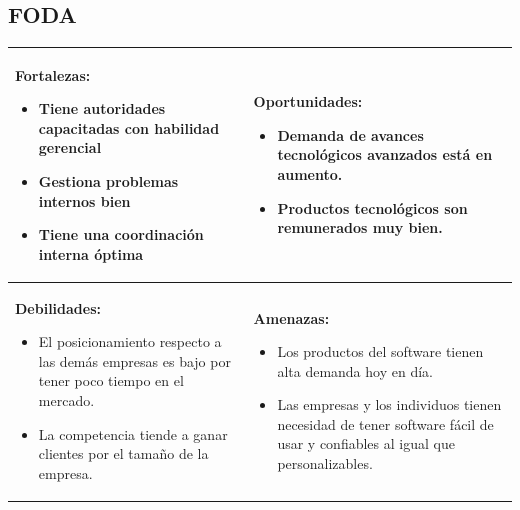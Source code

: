 \documentclass{article}
\begin{document}
\subsection{FODA}
\begin{center}
    \begin{tabular}{ | p{8.25cm} | p{8.25cm} | }
         \hline
             \textbf{Fortalezas: } 
             \begin{itemize}
                 \item Tiene autoridades capacitadas con habilidad gerencial 
                 \item Gestiona problemas internos bien 
                 \item Tiene una coordinación interna óptima
             \end{itemize}
             &
             \textbf{Oportunidades: } 
             \begin{itemize}
                 \item Demanda de avances tecnológicos avanzados está en aumento.
                 \item Productos tecnológicos son remunerados muy bien.
             \end{itemize}
             \\ 
         \hline
             \textbf{Debilidades: } 
             \begin{itemize}
                 \item El posicionamiento respecto a las demás empresas es bajo por tener poco tiempo en el mercado.
                 \item La competencia tiende a ganar clientes por el tamaño de la empresa.
             \end{itemize}
             &
             \textbf{Amenazas: } 
             \begin{itemize}
                 \item Los productos del software tienen alta demanda hoy en día.
                 \item Las empresas y los individuos tienen necesidad de tener software fácil de usar y confiables al igual que personalizables.
             \end{itemize}
             \\ 
         \hline
    \end{tabular}
 \end{center}


\end{document}
